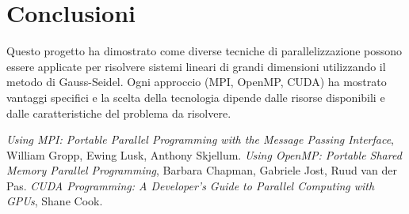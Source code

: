 \documentclass[a4paper,12pt]{article}
\begin{document}
\section{Conclusioni}
Questo progetto ha dimostrato come diverse tecniche di parallelizzazione possono essere applicate per risolvere sistemi lineari di grandi dimensioni utilizzando il metodo di Gauss-Seidel. Ogni approccio (MPI, OpenMP, CUDA) ha mostrato vantaggi specifici e la scelta della tecnologia dipende dalle risorse disponibili e dalle caratteristiche del problema da risolvere.

\begin{thebibliography}{9}
    \textit{Using MPI: Portable Parallel Programming with the Message Passing Interface}, William Gropp, Ewing Lusk, Anthony Skjellum.
    \textit{Using OpenMP: Portable Shared Memory Parallel Programming}, Barbara Chapman, Gabriele Jost, Ruud van der Pas.
    \textit{CUDA Programming: A Developer's Guide to Parallel Computing with GPUs}, Shane Cook.
\end{thebibliography}
\end{document}
